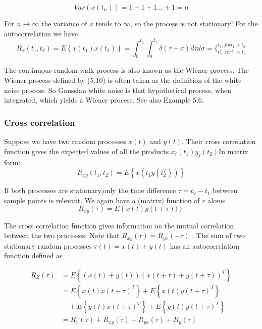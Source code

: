 	   \[ Var(x(t_{n})) =1+1+1...+1=n\]
	   
	   For $ n\rightarrow\infty $ the variance of $ x $ tends to $ \infty $, so the process is not stationary! For the autocorrelation we have
	   \begin{equation}\label{5.10}
	    R_{x}(t_{1},t_{2}) = E\left\lbrace x(t_{1})x(t_{2})\right\rbrace =\int_{0}^{t_{2}}\int_0^{t_{1}} \delta(\tau-\sigma)d\tau d\sigma=\{_{t1,for t_{1} < t_{2}}^{t_{2},for t_{1} > t_{2}} 
	   \end{equation}
	    
	   
	   The continuous random walk process is also known as the Wiener process. The Wiener process defined by (5.10) is often taken as the definition of the white noise process. So Gaussian white noise is that hypothetical process, when integrated, which yields a Wiener process. See also Example 5.6. 
	   
	                
	   \subsubsection { Cross correlation} 
	   
	   Suppose we have two random processes $ x(t) $ and $ y(t) $. Their cross correlation function gives the expected values of all the products $ x_{i}(t_{1})y_{j}(t_{2}) $In matrix form:
	   \begin{equation}\label{5.11}
	    R_{xy}(t_{1},t_{2}) = E\left\lbrace x(t_{1}y(t_{2}^{T})) \right\rbrace
	   \end{equation}
	   
	    
	    If both processes are stationary,only the time difference $ \tau=t_{2}-t_{1} $ between sample points is relevant. We again have a (matrix) function of $ r $ alone:
	    \begin{equation}\label{5.12}
	     R_{xy}(\tau) = E\left\lbrace x(t)y(t+\tau)) \right\rbrace 
	    \end{equation}
	   
	    
	    The cross correlation function gives information on the mutual correlation between the two processes. Note that $ R_{xy}(\tau)=R_{yx}(-\tau) $ . The sum of two stationary random processes $ \tau(t)=x(t)+y(t) $ has an autocorrelation function defined as 
	    
	    
	    \begin{equation}\label{5.13}
	    \begin{aligned}
	     R_{Z}(\tau)&=E\left\lbrace (x(t)+y(t))(x(t+\tau)+y(t+\tau))^{T}\right\rbrace\\
	     &=E\left\lbrace x(t)x(t+\tau)^{T}\right\rbrace +E\left\lbrace x(t)y(t+\tau)^{T}\right\rbrace\\
	     &\quad +E\left\lbrace y(t)x(t+\tau)^{T}\right\rbrace+E\left\lbrace y(t)y(t+\tau)^{T}\right\rbrace \\
	     &=R_{x}(\tau)+R_{xy}(\tau)+R_{yx}(\tau) +R_{y}(\tau)
	    \end{aligned}  
	    \end{equation}
	    
